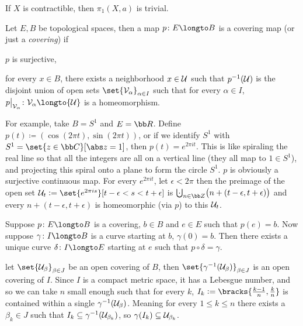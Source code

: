 \bcoro

    If $X$ is contractible, then $\pi_1(X,a)$ is trivial.

\ecoro

\bdefn

    Let $E,B$ be topological spaces, then a map $p\colon E\longto B$ is a {\emphcolor covering map} (or just a {\it covering}) if
    \benum
        \item $p$ is surjective,
        \item for every $x\in B$, there exists a neighborhood $x\in{\cal U}$ such that $p^{-1}({\cal U})$ is the disjoint union of open sets $\set{{\cal V}_\alpha}_{\alpha\in I}$ such that for every
            $\alpha\in I$, $p\bigl|_{{\cal V}_\alpha}\colon{\cal V}_\alpha\longto{\cal U}$ is a homeomorphism.
    \eenum

\edefn

For example, take $B=S^1$ and $E={\bb R}$.
Define $p(t)\coloneqq(\cos(2\pi t),\sin(2\pi t))$, or if we identify $S^1$ with $S^1=\set{z\in{\bb C}}[\abs z=1]$, then $p(t)=e^{2\pi it}$.
This is like spiraling the real line so that all the integers are all on a vertical line (they all map to $1\in S^1$), and projecting this spiral onto a plane to form the circle $S^1$.
$p$ is obviously a surjective continuous map.
For every $e^{2\pi it}$, let $\epsilon<2\pi$ then the preimage of the open set ${\cal U}_t\coloneqq\set{e^{2\pi is}}[t-\epsilon<s<t+\epsilon]$ is
$\bigdcup_{n\in{\bb Z}}\bigl(n+(t-\epsilon,t+\epsilon)\bigr)$ and every $n+(t-\epsilon,t+\epsilon)$ is homeomorphic (via $p$) to this ${\cal U}_t$.

\bthrm

    Suppose $p\colon E\longto B$ is a covering, $b\in B$ and $e\in E$ such that $p(e)=b$.
    Now suppose $\gamma\colon I\longto B$ is a curve starting at $b$, $\gamma(0)=b$.
    Then there exists a unique curve $\delta\colon I\longto E$ starting at $e$ such that $p\circ\delta=\gamma$.

\ethrm

\Proof let $\set{{\cal U}_\beta}_{\beta\in J}$ be an open covering of $B$, then $\set{\gamma^{-1}({\cal U}_\beta)}_{\beta\in J}$ is an open covering of $I$.
Since $I$ is a compact metric space, it has a Lebesgue number, and so we can take $n$ small enough such that for every $k$, $I_k\coloneqq\bracks{\frac{k-1}n,\frac kn}$ is contained within a single
$\gamma^{-1}({\cal U}_\beta)$.
Meaning for every $1\leq k\leq n$ there exists a $\beta_k\in J$ such that $I_k\subseteq\gamma^{-1}({\cal U}_{\beta_k})$, so $\gamma(I_k)\subseteq{\cal U}_{\beta_k}$.

